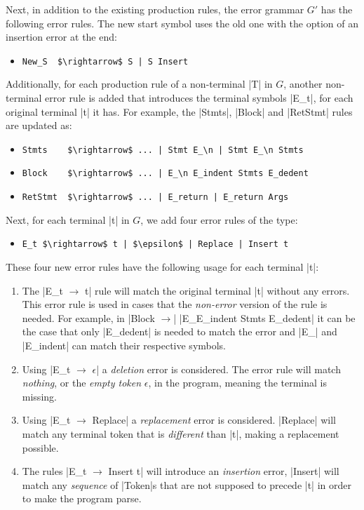 Next, in addition to the existing production rules, the error grammar $G'$ has
the following error rules. The new start symbol uses the old one with the option
of an insertion error at the end:
\begin{itemize}
  \item \lstinline{New_S  $\rightarrow$ S | S Insert}
\end{itemize}
Additionally, for each production rule of a non-terminal |T| in $G$, another
non-terminal error rule is added that introduces the terminal symbols |E_t|, for
each original terminal |t| it has. For example, the |Stmts|, |Block| and
|RetStmt| rules are updated as:
\begin{itemize}
  \item \lstinline{Stmts    $\rightarrow$ ... | Stmt E_\n | Stmt E_\n Stmts}
  \item \lstinline{Block    $\rightarrow$ ... | E_\n E_indent Stmts E_dedent}
  \item \lstinline{RetStmt  $\rightarrow$ ... | E_return | E_return Args}
\end{itemize}
Next, for each terminal |t| in $G$, we add four error rules of the type:
\begin{itemize}
  \item \lstinline{E_t $\rightarrow$ t | $\epsilon$ | Replace | Insert t}
\end{itemize}
These four new error rules have the following usage for each terminal |t|:
\begin{enumerate}
  \item The |E_t $\rightarrow$ t| rule will match the original terminal |t|
  without any errors. This error rule is used in cases that the \emph{non-error}
  version of the rule is needed. For example, in |Block $\rightarrow$| \break
  |E_\n E_indent Stmts E_dedent| it can be the case that only
  |E_dedent| is needed to match the error and |E_\n| and |E_indent| can match
  their respective symbols.
  \item Using |E_t $\rightarrow$ $\epsilon$| a \emph{deletion} error is
  considered. The error rule will match \emph{nothing}, or the \emph{empty
  token} $\epsilon$, in the program, meaning the terminal is missing.
  \item Using |E_t $\rightarrow$ Replace| a \emph{replacement} error is considered.
  |Replace| will match any terminal token that is \emph{different} than |t|,
  making a replacement possible.
  \item  The rules |E_t $\rightarrow$ Insert t| will introduce an
  \emph{insertion} error, \ie |Insert| will match any \emph{sequence} of
  |Token|s that are not supposed to precede |t| in order to make the program
  parse.
\end{enumerate}


